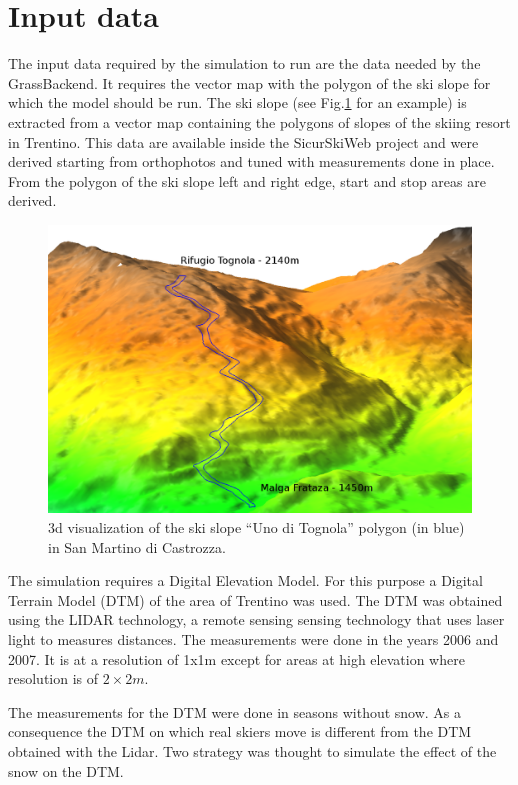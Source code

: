 \documentclass[12pt,a4paper,twoside]{book}
\begin{document}
\section{Input data}
The input data required by the simulation to run are the data needed by the GrassBackend. It requires the vector map with the polygon of the ski slope for which the model should be run. The ski slope (see Fig.\ref{uno_tognola_3d} for an example) is extracted from a vector map containing the polygons of slopes of the skiing resort in Trentino. This data are available inside the SicurSkiWeb project and were derived starting from orthophotos and tuned with measurements done in place. From the polygon of the ski slope left and right edge, start and stop areas are derived.

\begin{figure}[!h]
  \begin{center}
    \includegraphics[width=\textwidth]{images/uno_tognola_3d.eps}
    \caption{3d visualization of the ski slope ``Uno di Tognola'' polygon (in blue) in San Martino di Castrozza.}\label{uno_tognola_3d}
  \end{center}
\end{figure}

The simulation requires a Digital Elevation Model. For this purpose a Digital Terrain Model (DTM) of the area of Trentino was used. The DTM was obtained using the LIDAR technology, a remote sensing sensing technology that uses laser light to measures distances. The measurements were done in the years 2006 and 2007. It is at a resolution of 1x1m except for areas at high elevation where resolution is of $2\times 2m$.

The measurements for the DTM were done in seasons without snow. As a consequence the DTM on which real skiers move is different from the DTM obtained with the Lidar. Two strategy was thought to simulate the effect of the snow on the DTM.
\end{document}

